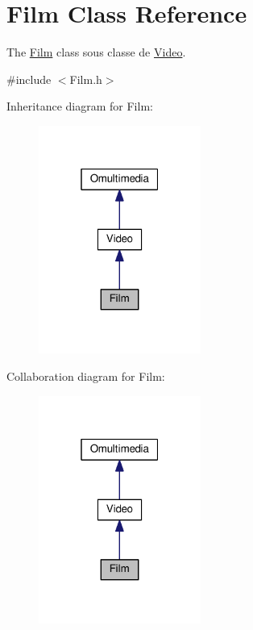 \hypertarget{class_film}{\section{Film Class Reference}
\label{class_film}
}


The \hyperlink{class_film}{Film} class sous classe de \hyperlink{class_video}{Video}.  




{\ttfamily \#include $<$Film.\+h$>$}



Inheritance diagram for Film\+:
\nopagebreak
\begin{figure}[H]
\begin{center}
\leavevmode
\includegraphics[width=151pt]{class_film__inherit__graph}
\end{center}
\end{figure}


Collaboration diagram for Film\+:
\nopagebreak
\begin{figure}[H]
\begin{center}
\leavevmode
\includegraphics[width=151pt]{class_film__coll__graph}
\end{center}
\end{figure}
